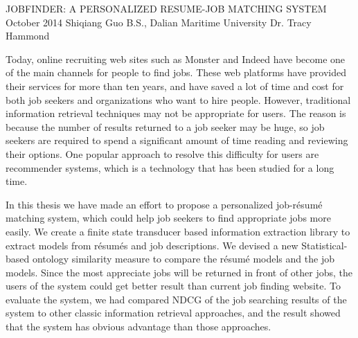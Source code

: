 \begingroup
\absone
{JOBFINDER: A PERSONALIZED RESUME-JOB MATCHING SYSTEM}
{October 2014}
{Shiqiang Guo}
{B.S., Dalian Maritime University}  %
{Dr. Tracy Hammond}%
{
Today, online recruiting web sites such as Monster and Indeed have become one of the main channels for people to find jobs. These web platforms have provided their services for more than ten years, and have saved a lot of time and cost for both job seekers and organizations who want to hire people. However, traditional information retrieval techniques may not be appropriate for users. The reason is because the number of results returned to a job seeker may be huge, so job seekers are required to spend a significant amount of time reading and reviewing their options. One popular approach to resolve this difficulty for users are recommender systems, which is a technology that has been studied for a long time.

In this thesis we have made an effort to propose a personalized job-r\'esum\'e matching system, which could help job seekers to find appropriate jobs more easily.  We create a finite state transducer based information extraction library to extract models from r\'esum\'es and job descriptions. We devised a new Statistical-based ontology similarity measure to compare the r\'esum\'e models and the job models. Since the most appreciate jobs will be returned in front of other jobs, the users of the system could get better result than current job finding website. To evaluate the system, we had compared NDCG of the job searching results of the system to other classic information retrieval approaches, and the result showed that the system has obvious advantage than those approaches.

}
\endgroup



